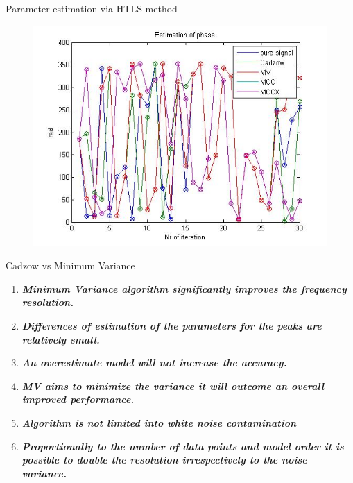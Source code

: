\documentclass[t,12pt,english
\ifx\beamermode\undefined\else,\beamermode\fi
]{beamer}
\begin{document}
\begin{frame}{Parameter estimation via HTLS method}
\begin{figure}[!htbp]
\endminipage\hfill
{}%
\centering
\includegraphics[width=.8\textwidth]{34.jpg}
\endminipage\hfill
\end{figure}

\end{frame}

\begin{frame}{Cadzow vs Minimum Variance}

\begin{block}{\footnotesize{}}\tiny{}
\begin{enumerate} 
\vspace{0.05cm}
     
    \item \tiny{\textbf{\textit{Minimum Variance algorithm significantly improves the frequency resolution.}}}
    \item \tiny{\textbf{\textit{Differences of estimation of the parameters for the peaks are relatively small.}}}
    \item \tiny{\textbf{\textit{An overestimate model will not increase the accuracy.}}}
    \item \tiny{\textbf{\textit{MV aims to minimize the variance it will outcome an overall improved performance.}}}
    \item \tiny{\textbf{\textit{Algorithm is not limited into white noise contamination}}}
    \item \tiny{\textbf{\textit{Proportionally to the number of data points and model order it is possible to double the resolution irrespectively to the noise variance. }}}
     
\end{enumerate}
\end{block}

\end{frame}
\end{document}
